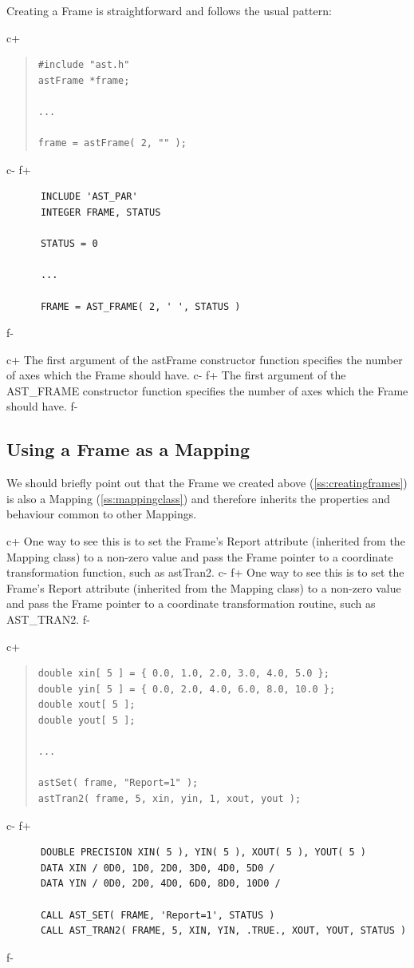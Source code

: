 \documentclass[twoside,11pt]{article}
\newcommand{\secref}[1]{\S\ref{#1}}
\renewcommand{\secref}[1]{\ref{#1}}
\begin{document}
Creating a Frame is straightforward and follows the usual pattern:

c+
\begin{quote}
\small
\begin{verbatim}
#include "ast.h"
astFrame *frame;

...

frame = astFrame( 2, "" );
\end{verbatim}
\normalsize
\end{quote}
c-
f+
\small
\begin{verbatim}
      INCLUDE 'AST_PAR'
      INTEGER FRAME, STATUS

      STATUS = 0

      ...

      FRAME = AST_FRAME( 2, ' ', STATUS )
\end{verbatim}
\normalsize
f-

c+
The first argument of the astFrame constructor function specifies the
number of axes which the Frame should have.
c-
f+
The first argument of the AST\_FRAME constructor function specifies
the number of axes which the Frame should have.
f-

\subsection{\label{ss:frameasmapping}Using a Frame as a Mapping}

We should briefly point out that the Frame we created above
(\secref{ss:creatingframes}) is also a Mapping
(\secref{ss:mappingclass}) and therefore inherits the properties and
behaviour common to other Mappings.

c+
One way to see this is to set the Frame's Report attribute (inherited
from the Mapping class) to a non-zero value and pass the Frame pointer
to a coordinate transformation function, such as astTran2.
c-
f+
One way to see this is to set the Frame's Report attribute (inherited
from the Mapping class) to a non-zero value and pass the Frame pointer
to a coordinate transformation routine, such as AST\_TRAN2.
f-

c+
\begin{quote}
\small
\begin{verbatim}
double xin[ 5 ] = { 0.0, 1.0, 2.0, 3.0, 4.0, 5.0 };
double yin[ 5 ] = { 0.0, 2.0, 4.0, 6.0, 8.0, 10.0 };
double xout[ 5 ];
double yout[ 5 ];

...

astSet( frame, "Report=1" );
astTran2( frame, 5, xin, yin, 1, xout, yout );
\end{verbatim}
\normalsize
\end{quote}
c-
f+
\small
\begin{verbatim}
      DOUBLE PRECISION XIN( 5 ), YIN( 5 ), XOUT( 5 ), YOUT( 5 )
      DATA XIN / 0D0, 1D0, 2D0, 3D0, 4D0, 5D0 /
      DATA YIN / 0D0, 2D0, 4D0, 6D0, 8D0, 10D0 /

      CALL AST_SET( FRAME, 'Report=1', STATUS )
      CALL AST_TRAN2( FRAME, 5, XIN, YIN, .TRUE., XOUT, YOUT, STATUS )
\end{verbatim}
\normalsize
f-
\end{document}
